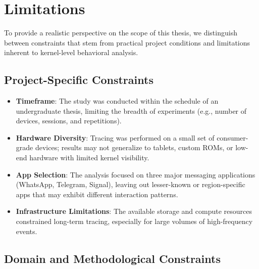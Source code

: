 \documentclass[a4paper,12pt]{report}
\begin{document}
\vspace{0.5em}
\noindent{}

\vspace{0.5em}
\noindent{}

\vspace{0.5em}
\noindent{}


\section{Limitations}

To provide a realistic perspective on the scope of this thesis, we distinguish between constraints that stem from practical project conditions and limitations inherent to kernel-level behavioral analysis.

\subsection*{Project-Specific Constraints}

\begin{itemize}
\item \textbf{Timeframe}: The study was conducted within the schedule of an undergraduate thesis, limiting the breadth of experiments (e.g., number of devices, sessions, and repetitions).
\item \textbf{Hardware Diversity}: Tracing was performed on a small set of consumer-grade devices; results may not generalize to tablets, custom ROMs, or low-end hardware with limited kernel visibility.
\item \textbf{App Selection}: The analysis focused on three major messaging applications (WhatsApp, Telegram, Signal), leaving out lesser-known or region-specific apps that may exhibit different interaction patterns.
\item \textbf{Infrastructure Limitations}: The available storage and compute resources constrained long-term tracing, especially for large volumes of high-frequency events.
\end{itemize}

\subsection*{Domain and Methodological Constraints}
\end{document}
